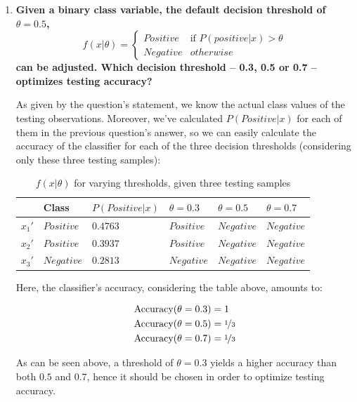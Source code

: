 \documentclass[12pt]{article}
\begin{document}
\begin{enumerate}[leftmargin=\labelsep]
        \pagebreak

  \item \textbf{Given a binary class variable, the default decision threshold of $\theta = 0.5$,
          $$
            f(x | \theta) = \begin{cases}
              Positive & \text{if } P(positive | x) > \theta \\
              Negative & otherwise
            \end{cases}
          $$
          can be adjusted. Which decision threshold – 0.3, 0.5 or 0.7 – optimizes testing accuracy?
        }

        As given by the question's statement, we know the actual class values of the testing observations.
        Moreover, we've calculated $P(Positive | x)$ for each of them in the previous question's answer,
        so we can easily calculate the accuracy of the classifier for each of the three decision thresholds
        (considering only these three testing samples):

        \begin{table}[h]
          \centering
          \begin{tabular}{l|l|l|l|l|l}
            \hline
                   & Class      & $P(Positive | x)$ & $\theta = 0.3$ & $\theta = 0.5$ & $\theta = 0.7$ \\ \hline
            $x_1'$ & $Positive$ & $0.4763$          & $Positive$     & $Negative$     & $Negative$     \\ \hline
            $x_2'$ & $Positive$ & $0.3937$          & $Positive$     & $Negative$     & $Negative$     \\ \hline
            $x_3'$ & $Negative$ & $0.2813$          & $Negative$     & $Negative$     & $Negative$     \\ \hline
          \end{tabular}
          \caption{$f(x | \theta)$ for varying thresholds, given three testing samples}
          \label{tab:thresholds}
        \end{table}

        Here, the classifier's accuracy, considering the table above, amounts to:

        \begin{align*}
          \text{Accuracy}(\theta = 0.3) & = 1               \\
          \text{Accuracy}(\theta = 0.5) & = \nicefrac{1}{3} \\
          \text{Accuracy}(\theta = 0.7) & = \nicefrac{1}{3}
        \end{align*}

        As can be seen above, a threshold of $\theta = 0.3$ yields a higher accuracy than
        both $0.5$ and $0.7$, hence it should be chosen in order to optimize testing accuracy.

\end{enumerate}
\end{document}

